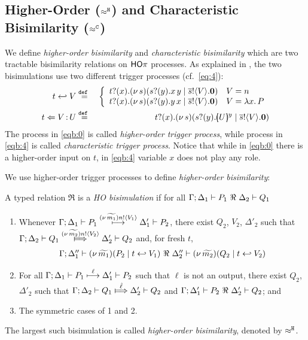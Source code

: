 \subsection{Higher-Order ($\approx^\mathtt{H}$) and  Characteristic  Bisimilarity ($\approx^\mathtt{C}$)}
\label{ss:hwb}

We define \emph{higher-order bisimilarity} and 
\emph{characteristic bisimilarity} which are
two tractable bisimilarity relations on $\mathsf{HO}\pi$ processes.
As explained in ,
the two bisimulations 
use two different trigger processes (cf.~\eqref{eq:4}):
%
\begin{eqnarray}
	t \hookleftarrow V	& \stackrel{\mathtt{def}\ }{=} &
	\left\{ \begin{array}{ll}
		t ? (x) . (\nu\, s)(s ? (y) . x\, {y} \;|\; \overline{s} ! \langle V \rangle . \mathbf{0}) & V = n\\
		t ? (x) . (\nu\, s)(s ? (y) . y\, {x} \;|\; \overline{s} ! \langle V \rangle . \mathbf{0}) & V = \lambda x.\,P
	\end{array}
	\right.
	\label{eqb:0} \\
	t \Leftarrow V{\,:\,}U	& \stackrel{\mathtt{def}\ }{=} &	t ? (x) . (\nu\, s)(s ? (y) . [\!\!(U)\!\!]^{y} \;|\; \overline{s} ! \langle V \rangle . \mathbf{0})	\label{eqb:4}
\end{eqnarray}
%
The process in \eqref{eqb:0} is called \emph{higher-order trigger process},
while process in \eqref{eqb:4} is called \emph{characteristic trigger process}.
Notice that while 
in \eqref{eqb:0} there is a higher-order input on $t$, 
in \eqref{eqb:4} variable $x$ does not play any role.

We use higher-order trigger processes to define \emph{higher-order bisimilarity}:

\begin{definition}
	\label{d:hwb}
	A typed relation $\Re$ is a {\em  HO bisimulation} if 
	for all $\Gamma; \Delta_1 \vdash P_1 \ \Re \  \Delta_2 \vdash Q_1$ 
%
	\begin{enumerate}[1)]
		\item 
				Whenever 
				$\Gamma; \Delta_1 \vdash P_1 \stackrel{(\nu\, \widetilde{m_1}) n ! \langle V_1 \rangle}{\longmapsto} \Delta_1' \vdash P_2$, there exist 
				$Q_2$, $V_2$, $\Delta'_2$ such that 
				$\horel{\Gamma}{\Delta_2}{Q_1}{\Hby{\news{\widetilde{m_2}} \bactout{n}{V_2}}}{\Delta_2'}{Q_2}$ and, for fresh $t$, 
				\[
					\begin{array}{lrlll}
						\Gamma; \Delta''_1  \proves  {\newsp{\widetilde{m_1}}{P_2 \Par \htrigger{t}{V_1}}}
						\ \Re\ 
						\Delta''_2 \proves {\newsp{\widetilde{m_2}}{Q_2 \Par \htrigger{t}{V_2}}}
					\end{array}
				\]
		\item	
				For all $\Gamma; \Delta_1 \vdash P_1 \stackrel{\ell}{\longmapsto} \Delta_1' \vdash P_2$ such that 
				$\ell$ is not an output, 
				there exist $Q_2$, $\Delta'_2$ such that 
				$\horel{\Gamma}{\Delta_2}{Q_1}{\Hby{\hat{\ell}}}{\Delta_2'}{Q_2}$
				and
				$\Gamma; \Delta_1' \vdash P_2 \ \Re \  \Delta_2' \vdash Q_2$; and 

		\item	The symmetric cases of 1 and 2.                
	\end{enumerate}
%
	The largest such bisimulation is called \emph{higher-order bisimilarity}, denoted by $\approx^\mathtt{H}$.
\end{definition}


